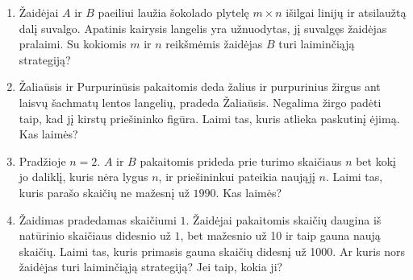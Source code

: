 \begin{enumerate}

  \item Žaidėjai $A$ ir $B$ paeiliui laužia šokolado plytelę  $m\times n$ išilgai
    linijų ir atsilaužtą dalį suvalgo. Apatinis kairysis langelis yra
    užnuodytas, jį suvalgęs žaidėjas pralaimi. Su kokiomis $m$ ir $n$ reikšmėmis
    žaidėjas $B$ turi laiminčiąją strategiją? 

  \item Žaliaūsis ir Purpurinūsis pakaitomis deda žalius ir purpurinius žirgus
    ant laisvų šachmatų lentos langelių, pradeda Žaliaūsis. Negalima žirgo
    padėti taip, kad jį kirstų priešininko figūra. Laimi tas, kuris atlieka
    paskutinį ėjimą. Kas laimės?

  \item Pradžioje $n=2$. $A$ ir $B$ pakaitomis prideda prie turimo skaičiaus $n$
    bet kokį jo daliklį, kuris nėra lygus $n$, ir priešininkui pateikia naująjį
    $n$. Laimi tas, kuris parašo skaičių ne mažesnį už $1990$. Kas laimės?

  \item Žaidimas pradedamas skaičiumi $1$. Žaidėjai pakaitomis skaičių daugina iš
    natūrinio skaičiaus didesnio už $1$, bet mažesnio už 10 ir taip gauna naują
    skaičių. Laimi tas, kuris primasis gauna skaičių didesnį už 1000. Ar kuris
    nors žaidėjas turi laiminčiąją strategiją? Jei taip, kokia ji?  


\end{enumerate}
